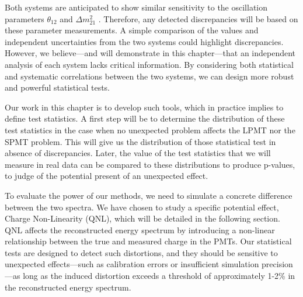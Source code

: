\documentclass[../main.tex]{subfiles}
\begin{document}
Both systems are anticipated to show similar sensitivity to the oscillation parameters $\theta_{12}$ and $\Delta m^2_{21}$ \cite{juno_collaboration_sub-percent_2022}. Therefore, any detected discrepancies will be based on these parameter measurements. A simple comparison of the values and independent uncertainties from the two systems could highlight discrepancies. However, we believe—and will demonstrate in this chapter—that an independent analysis of each system lacks critical information. By considering both statistical and systematic correlations between the two systems, we can design more robust and powerful statistical tests.

Our work in this chapter is to develop such tools, which in practice implies to define test statistics. A first step will be to determine the distribution of these test statistics in the case  when no unexpected problem affects the LPMT nor the SPMT problem. This will give us the distribution of those statistical test in absence of discrepancies. Later, the value of the test statistics that we will measure in real data can be compared to these distributions to produce p-values, to judge of the potential present of an unexpected effect.

To evaluate the power of our methods, we need to simulate a concrete difference between the two spectra.
We have chosen to study a specific potential effect, Charge Non-Linearity (QNL), which will be detailed in the following section. QNL affects the reconstructed energy spectrum by introducing a non-linear relationship between the true and measured charge in the PMTs. Our statistical tests are designed to detect such distortions, and they should be sensitive to unexpected effects—such as calibration errors or insufficient simulation precision—as long as the induced distortion exceeds a threshold of approximately 1-2\% in the reconstructed energy spectrum.
\end{document}
